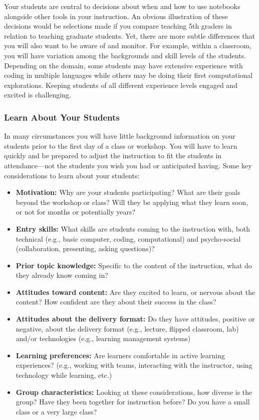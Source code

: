 \documentclass[]{book}
\providecommand{\tightlist}{%
  \setlength{\itemsep}{0pt}\setlength{\parskip}{0pt}}
\begin{document}
Your students are central to decisions about when and how to use notebooks
alongside other tools in your instruction. An obvious illustration of these
decisions would be selections made if you compare teaching 5th graders in
relation to teaching graduate students. Yet, there are more subtle differences
that you will also want to be aware of and monitor. For example, within a
classroom, you will have variation among the backgrounds and skill levels of the
students. Depending on the domain, some students may have extensive experience
with coding in multiple languages while others may be doing their first
computational explorations. Keeping students of all different experience levels
engaged and excited is challenging.

\hypertarget{learn-about-your-students}{%
\subsubsection{Learn About Your Students}\label{learn-about-your-students}}

In many circumstances you will have little background information on your
students prior to the first day of a class or workshop. You will have to learn
quickly and be prepared to adjust the instruction to fit the students in
attendance---not the students you wish you had or anticipated having. Some key
considerations to learn about your students:

\begin{itemize}
\tightlist
\item
  \textbf{Motivation:} Why are your students participating? What are their goals
  beyond the workshop or class? Will they be applying what they learn soon, or
  not for months or potentially years?
\item
  \textbf{Entry skills:} What skills are students coming to the instruction with,
  both technical (e.g., basic computer, coding, computational) and
  psycho-social (collaboration, presenting, asking questions)?
\item
  \textbf{Prior topic knowledge:} Specific to the content of the instruction, what
  do they already know coming in?
\item
  \textbf{Attitudes toward content:} Are they excited to learn, or nervous about
  the content? How confident are they about their success in the class?
\item
  \textbf{Attitudes about the delivery format:} Do they have attitudes, positive or
  negative, about the delivery format (e.g., lecture, flipped classroom, lab)
  and/or technologies (e.g., learning management systems)
\item
  \textbf{Learning preferences:} Are learners comfortable in active learning
  experiences? (e.g., working with teams, interacting with the instructor,
  using technology while learning, etc.)
\item
  \textbf{Group characteristics:} Looking at these considerations, how diverse is
  the group? Have they been together for instruction before? Do you have a
  small class or a very large class?
\end{itemize}
\end{document}
